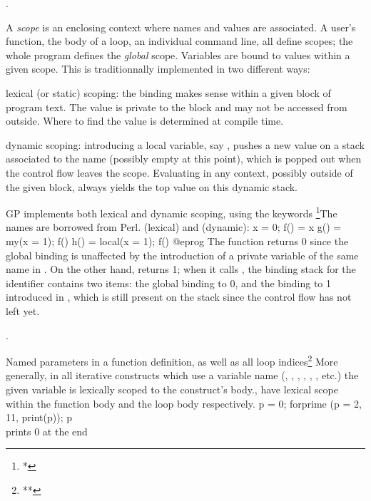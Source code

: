 .

A \emph{scope} is an enclosing context where names and values are associated.
A user's function, the body of a loop, an individual command line, all define
scopes; the whole program defines the \emph{global} scope. Variables are
bound to values within a given scope. This is traditionnally implemented in
two different ways:

\item{} lexical (or static) scoping: the binding makes
sense within a given block of program text. The value is private to the block
and may not be accessed from outside. Where to find the value is determined
at compile time.

\item{} dynamic scoping: introducing a local variable,
say , pushes a new value on a stack associated to the name 
(possibly empty at this point), which is popped out when the control flow
leaves the scope. Evaluating  in any context, possibly outside of the
given block, always yields the top value on this dynamic stack.

GP implements both lexical and dynamic scoping, using the keywords%
\footnote{*}{The names are borrowed from Perl.}
 (lexical) and  (dynamic):
\bprog
  x = 0;
  f() = x
  g() =    my(x = 1); f()
  h() = local(x = 1); f()
@eprog\noindent
The function  returns 0 since the global  binding
is unaffected by the introduction of a private variable of the same name in
. On the other hand,  returns 1; when it calls , the
binding stack for the  identifier contains two items: the global
binding to 0, and the binding to 1 introduced in , which is still
present on the stack since the control flow has not left  yet.

.

Named parameters in a function definition, as well as all loop
indices\footnote{**}{
More generally, in all iterative constructs which use a variable name
(, , , , ,
, etc.) the given variable is lexically scoped to the construct's
body.},
have lexical scope within the function body and the loop body respectively.
\bprog
p = 0;
forprime (p = 2, 11, print(p)); p   \\ prints 0 at the end

